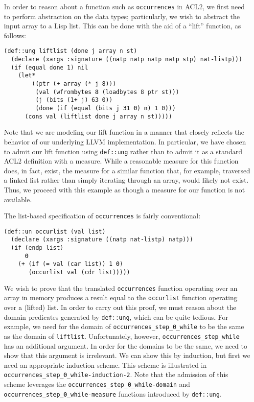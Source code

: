 \documentclass{eptcs}
\begin{document}
In order to reason about a function such as \texttt{occurrences} in
ACL2, we first need to perform abstraction on the data types;
particularly, we wish to abstract the input array to a Lisp list.
This can be done with the aid of a ``lift'' function, as follows:

\begin{verbatim}
(def::ung liftlist (done j array n st)
  (declare (xargs :signature ((natp natp natp natp stp) nat-listp)))
  (if (equal done 1) nil
    (let* 
        ((ptr (+ array (* j 8)))
         (val (wfrombytes 8 (loadbytes 8 ptr st)))
         (j (bits (1+ j) 63 0))
         (done (if (equal (bits j 31 0) n) 1 0)))
      (cons val (liftlist done j array n st)))))
\end{verbatim}

Note that we are modeling our lift function in a manner that closely
reflects the behavior of our underlying LLVM implementation.  In
particular, we have chosen to admit our lift function using
\texttt{def::ung} rather than to admit it as a standard ACL2
definition with a measure.  While a reasonable measure for this
function does, in fact, exist, the measure for a similar function that,
for example, traversed a linked list rather than simply iterating through an array,
would likely not exist.  Thus, we proceed with this example as though
a measure for our function is not available.

The list-based specification of \texttt{occurrences} is fairly conventional:

\begin{verbatim}
(def::un occurlist (val list)
  (declare (xargs :signature ((natp nat-listp) natp)))
  (if (endp list)
      0
    (+ (if (= val (car list)) 1 0)
       (occurlist val (cdr list)))))
\end{verbatim}

We wish to prove that the translated \texttt{occurrences} function
operating over an array in memory produces a result equal to the
\texttt{occurlist} function operating over a (lifted) list.  In order to
carry out this proof, we must reason about the domain predicates
generated by \texttt{def::ung}, which can be quite tedious.  For
example, we need for the domain of \texttt{occurrences\_step\_0\_while}
to be the same as the domain of \texttt{liftlist}.  Unfortunately,
however, \texttt{occurrences\_step\_while} has an additional
argument.  In order for the domains to be the same, we need to show
that this argument is irrelevant.  We can show this by induction, but
first we need an appropriate induction scheme.  This scheme is
illustrated in \texttt{occurrences\_step\_0\_while-induction-2}.
Note that the admission of this scheme leverages the
\texttt{occurrences\_step\_0\_while-domain} and
\texttt{occurrences\_step\_0\_while-measure} functions introduced by
\texttt{def::ung}.
\end{document}

